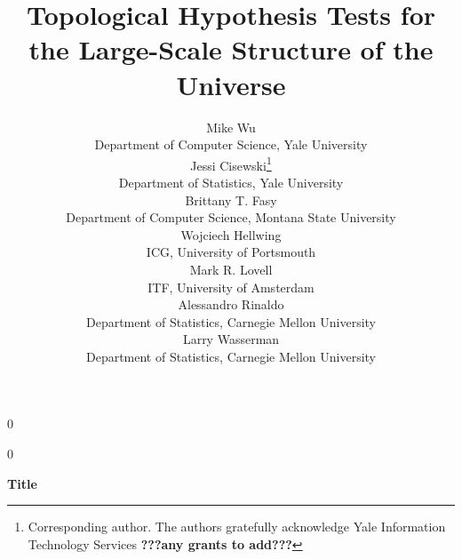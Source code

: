 \documentclass[12pt]{article}
\newcommand{\blind}{0}
\begin{document}
%

\def\spacingset#1{\renewcommand{\baselinestretch}%
{#1}\small\normalsize} \spacingset{1}



\blind
{
  \title{\bf Topological Hypothesis Tests for the Large-Scale Structure of the Universe}
  \author{
    Mike Wu\\
    Department of Computer Science, Yale University \\
    Jessi Cisewski\thanks{
    Corresponding author.  The authors gratefully acknowledge Yale Information Technology Services {\bf ???any grants to add???}}\hspace{.2cm} \\
    Department of Statistics, Yale University \\
    Brittany T. Fasy\\
    Department of Computer Science, Montana State University \\
    Wojciech Hellwing \\
    ICG, University of Portsmouth \\
    Mark R. Lovell\\
    ITF, University of Amsterdam \\
    Alessandro Rinaldo\\
    Department of Statistics, Carnegie Mellon University \\
    Larry Wasserman\\
    Department of Statistics, Carnegie Mellon University \\
  }
  \maketitle
} \fi

\blind
{
  \bigskip
  \begin{center}
    {\LARGE\bf Title}
\end{center}
  \medskip
} \fi

\end{document}
